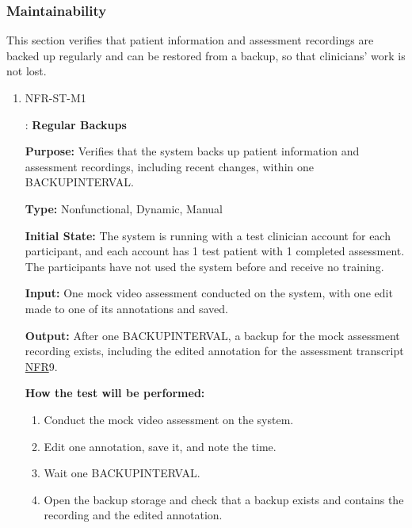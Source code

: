 \documentclass[12pt, titlepage]{article}
\newcommand{\srsnfr}[1]{\href{https://github.com/Nour-Fawaz/MacaBoca/blob/main/pdfs/SRS/SRS.pdf}{NFR}}
\renewcommand{\_}{\oldunderscore\allowbreak}
\begin{document}
\subsubsection{Maintainability}
This section verifies that patient information and assessment recordings are backed up regularly and can be restored from a backup, so that clinicians' work is not lost.
\begin{enumerate}
  \item \hypertarget{NFR-ST-M1}{NFR-ST-M1}: \textbf{Regular Backups\\}
  \begin{mdframed}[linewidth=0.5mm]
      \textbf{Purpose:} Verifies that the system backs up patient information and assessment recordings, including recent changes, within one BACKUP\_INTERVAL. \par
      \textbf{Type:} Nonfunctional, Dynamic, Manual \par
      \textbf{Initial State:} The system is running with a test clinician account for each participant, and each account has 1 test patient with 1 completed assessment. The participants have not used the system before and receive no training. \par
      \textbf{Input:} One mock video assessment conducted on the system, with one edit made to one of its annotations and saved. \par
      \textbf{Output:} After one BACKUP\_INTERVAL, a backup for the mock assessment recording exists, including the edited annotation for the assessment transcript \srsnfr*{9}. \par
      \textbf{How the test will be performed:}
      \begin{enumerate}
      \item[1.] Conduct the mock video assessment on the system.
      \item[2.] Edit one annotation, save it, and note the time.
      \item[3.] Wait one BACKUP\_INTERVAL.
      \item[4.] Open the backup storage and check that a backup exists and contains the recording and the edited annotation.
      \end{enumerate}
    \end{mdframed}


\end{enumerate}
\end{document}
